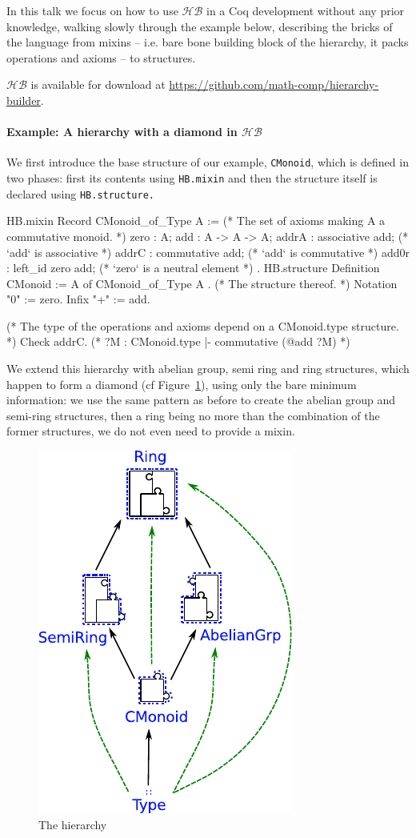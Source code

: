 \documentclass{easychair}
\newcommand{\HB}{\ensuremath{\mathcal{HB}}}
\begin{document}
In this talk we focus on how to use \HB{} in a Coq development without
any prior knowledge, walking slowly through the example below,
describing the bricks of the language from mixins -- i.e. bare bone building
block of the hierarchy, it packs operations and axioms -- to structures.

\HB{} is available for download at \url{https://github.com/math-comp/hierarchy-builder}.

\paragraph{Example: A hierarchy with a diamond in \HB{}}

We first introduce the base structure of our example,
\verb-CMonoid-, which is defined in two phases: first its contents
using \verb-HB.mixin- and then the structure itself is declared using
\verb-HB.structure.-

\begin{coqcode}
HB.mixin Record CMonoid_of_Type A := { (* The set of axioms making A a commutative monoid. *)
  zero  : A; add   : A -> A -> A;
  addrA : associative add;  (* `add` is associative  *)
  addrC : commutative add;  (* `add` is commutative  *)
  add0r : left_id zero add; (* `zero` is a neutral element *)
}.
HB.structure Definition CMonoid := { A of CMonoid_of_Type A }. (* The structure thereof. *)
Notation "0" := zero.
Infix    "+" := add.

(* The type of the operations and axioms depend on a CMonoid.type structure. *)
Check addrC. (* ?M : CMonoid.type |- commutative (@add ?M) *)
\end{coqcode}

We extend this hierarchy with abelian group, semi ring and ring
structures, which happen to form a diamond (cf
Figure~\ref{fig:hierarchy}), using only the bare minimum information:
we use the same pattern as before to create the abelian group and
semi-ring structures, then a ring being no more than the combination
of the former structures, we do not even need to provide a mixin.

\begin{figure}
  \vspace{-27em}
  \includegraphics[width=.35\textwidth]{diagram.pdf}
  \vspace{-1.5em}
  \caption{The hierarchy}
  \label{fig:hierarchy}
\end{figure}
\end{document}
